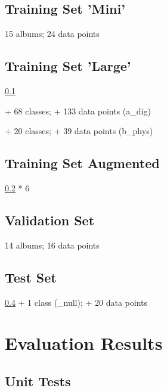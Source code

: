 \begin{uomappendix}
            \subsection{Training Set 'Mini'} \label{data:mini}
    
                15 albums; 24 data points
    
            \subsection{Training Set 'Large'} \label{data:large}
    
                \ref{data:mini}
                
                + 68 classes; + 133 data points (a_dig)
    
                + 20 classes; + 39 data points (b_phys)
    
            \subsection{Training Set Augmented} \label{data:aug}
    
                \ref{data:large} * 6
    
            \subsection{Validation Set} \label{data:val}
    
                14 albums; 16 data points
    
            \subsection{Test Set} \label{data:test}
    
                \ref{data:val} + 1 class (\_null); + 20 data points
    
        \section{Evaluation Results}
    
            \subsection{Unit Tests}

\end{uomappendix}
